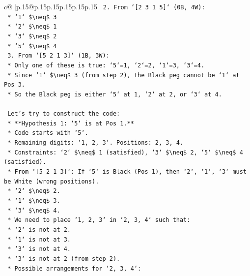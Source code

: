 \documentclass{article}
\begin{document}
{\begin{supertabular}{c@{$\;$}|p{.15\linewidth}@{}p{.15\linewidth}p{.15\linewidth}p{.15\linewidth}p{.15\linewidth}p{.15\linewidth}}
{{{\texttt{    2.  From `{[}2 3 1 5{]}` (0B, 4W):} \\
\texttt{        *   `1` \$\textbackslash{}neq\$ 3} \\
\texttt{        *   `2` \$\textbackslash{}neq\$ 1} \\
\texttt{        *   `3` \$\textbackslash{}neq\$ 2} \\
\texttt{        *   `5` \$\textbackslash{}neq\$ 4} \\
\texttt{    3.  From `{[}5 2 1 3{]}` (1B, 3W):} \\
\texttt{        *   Only one of these is true: `5`=1, `2`=2, `1`=3, `3`=4.} \\
\texttt{        *   Since `1` \$\textbackslash{}neq\$ 3 (from step 2), the Black peg cannot be `1` at Pos 3.} \\
\texttt{        *   So the Black peg is either `5` at 1, `2` at 2, or `3` at 4.} \\
\\ 
\texttt{    Let's try to construct the code:} \\
\texttt{    *   **Hypothesis 1: `5` is at Pos 1.**} \\
\texttt{        *   Code starts with `5`.} \\
\texttt{        *   Remaining digits: `1, 2, 3`. Positions: 2, 3, 4.} \\
\texttt{        *   Constraints: `2` \$\textbackslash{}neq\$ 1 (satisfied), `3` \$\textbackslash{}neq\$ 2, `5` \$\textbackslash{}neq\$ 4 (satisfied).} \\
\texttt{        *   From `{[}5 2 1 3{]}`: If `5` is Black (Pos 1), then `2`, `1`, `3` must be White (wrong positions).} \\
\texttt{            *   `2` \$\textbackslash{}neq\$ 2.} \\
\texttt{            *   `1` \$\textbackslash{}neq\$ 3.} \\
\texttt{            *   `3` \$\textbackslash{}neq\$ 4.} \\
\texttt{        *   We need to place `1, 2, 3` in `2, 3, 4` such that:} \\
\texttt{            *   `2` is not at 2.} \\
\texttt{            *   `1` is not at 3.} \\
\texttt{            *   `3` is not at 4.} \\
\texttt{            *   `3` is not at 2 (from step 2).} \\
\texttt{        *   Possible arrangements for `2, 3, 4`:} \\
}}}
\end{supertabular}}
\end{document}
